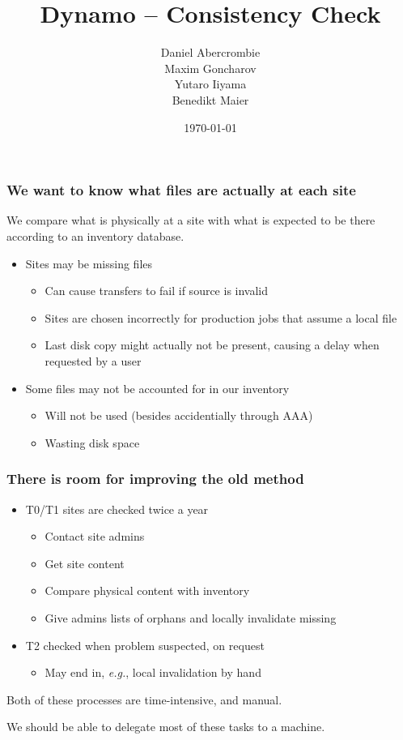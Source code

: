 \documentclass{beamer}
\author[Dynamo Team]{
  Daniel Abercrombie \\
  Maxim Goncharov \\
  Yutaro Iiyama \\
  Benedikt Maier
}
\title{\bf \sffamily Dynamo -- Consistency Check}
\date{\today}
\begin{document}
\begin{frame}[nonumbering]
  \titlepage
\end{frame}

\begin{frame}
  \frametitle{We want to know what files are actually at each site}

  We compare what is physically at a site with what is
  expected to be there according to an inventory database.

  \begin{itemize}
  \item Sites may be missing files
    \begin{itemize}
    \item Can cause transfers to fail if source is invalid
    \item Sites are chosen incorrectly for production jobs
      that assume a local file
    \item Last disk copy might actually not be present,
      causing a delay when requested by a user
    \end{itemize}
  \item Some files may not be accounted for in our inventory
    \begin{itemize}
    \item Will not be used (besides accidentially through AAA)
    \item Wasting disk space
    \end{itemize}
  \end{itemize}

\end{frame}

\begin{frame}
  \frametitle{There is room for improving the old method}

  \begin{itemize}
  \item T0/T1 sites are checked twice a year
    \begin{itemize}
    \item Contact site admins
    \item Get site content
    \item Compare physical content with inventory
    \item Give admins lists of orphans and locally invalidate missing
    \end{itemize}
  \item T2 checked when problem suspected, on request
    \begin{itemize}
    \item May end in, \emph{e.g.}, local invalidation by hand
    \end{itemize}
  \end{itemize}

  Both of these processes are time-intensive, and manual.

  We should be able to delegate most of these tasks to a machine.

\end{frame}
\end{document}
